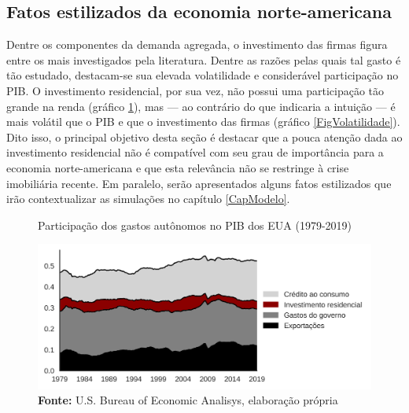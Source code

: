 \subsection{Fatos estilizados da economia norte-americana}\label{FatosEUA}


Dentre os componentes da demanda agregada, o investimento das firmas figura entre os mais investigados pela literatura.
Dentre as razões pelas quais tal gasto é tão estudado, destacam-se sua elevada volatilidade e considerável participação no PIB.
O investimento residencial, por sua vez, não possui uma participação tão grande na renda (gráfico \ref{FigAutonomos}), mas --- ao contrário do que indicaria a intuição --- é mais volátil que o PIB e que o investimento das firmas (gráfico \ref{FigVolatilidade}). 
Dito isso, o principal objetivo desta seção é destacar que a pouca atenção dada ao investimento residencial não é compatível com seu grau de importância para a economia norte-americana e que esta relevância não se restringe à crise imobiliária recente.
Em paralelo, serão apresentados alguns fatos estilizados que irão contextualizar as simulações no capítulo \ref{CapModelo}.




\begin{figure}[H]
	\centering
	\caption{Participação dos gastos autônomos no PIB dos EUA (1979-2019)}
	\label{FigAutonomos}
	\includegraphics[width=\textwidth]{../../Dados/Fatos_Estilizados/figs/Gastos_autonomos.png}
	\caption*{\textbf{Fonte:} U.S. Bureau of Economic Analisys, elaboração própria}
\end{figure}


